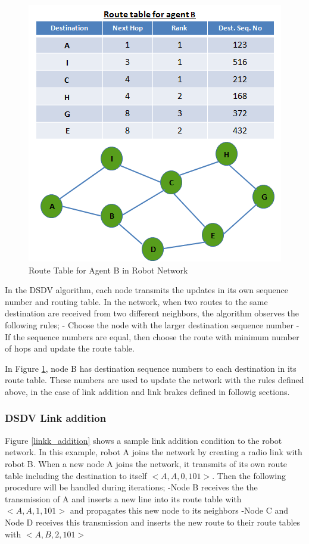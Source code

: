 \begin{figure}[H]
\caption{Route Table for Agent B in Robot Network} \label{dest_seq_ref}
\centering
\includegraphics[scale = 0.75]{dest_seq}
\end{figure}

In the DSDV algorithm, each node transmits the updates in its own sequence number and routing table. In the network, when two routes to the same destination are received from two different neighbors, the algorithm observes the following rules;\newline
	- Choose the node with the larger destination sequence number \newline
	- If the sequence numbers are equal, then choose the route with minimum number of hops and update the route table.

In Figure \ref{dest_seq_ref}, node B has destination sequence numbers to each destination in its route table. These numbers are used to update the network with the rules defined above, in the case of link addition and link brakes defined in followig sections.
\newpage	
\subsubsection{DSDV Link addition}

Figure \ref{linkk_addition} shows a sample link addition condition to the robot network. In this example, robot A joins the network by creating a radio link with robot B. When a new node A joins the network, it transmits of its own route table including the destination to itself $<A,A,0,101>$. Then the following procedure will be handled during iterations; \newline
	-Node B receives the the transmission of A and inserts a new line into its route table with $<A,A,1,101>$ and propagates this new node to its neighbors \newline
	-Node C and Node D receives this transmission and inserts the new route to their route tables with $<A,B,2,101>$

